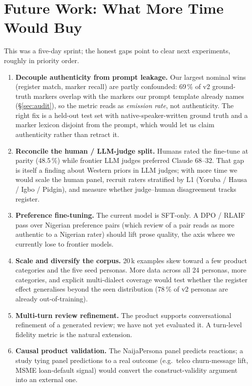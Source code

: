 \documentclass[sigconf,nonacm,balance]{acmart}
\begin{document}
\section{Future Work: What More Time Would Buy}
\label{sec:futurework}

This was a five-day sprint; the honest gaps point to clear next experiments,
roughly in priority order.

\begin{enumerate}[leftmargin=*]
  \item \textbf{Decouple authenticity from prompt leakage.} Our largest
        nominal wins (register match, marker recall) are partly confounded:
        69\,\% of v2 ground-truth markers overlap with the markers our prompt
        template already names (\S\ref{sec:audit}), so the metric reads as
        \emph{emission rate}, not authenticity. The right fix is a
        held-out test set with native-speaker-written ground truth and a
        marker lexicon disjoint from the prompt, which would let us claim
        authenticity rather than retract it.
  \item \textbf{Reconcile the human / LLM-judge split.} Humans rated the
        fine-tune at parity (48.5\,\%) while frontier LLM judges preferred
        Claude 68--32. That gap is itself a finding about Western priors in
        LLM judges; with more time we would scale the human panel, recruit
        raters stratified by L1 (Yoruba / Hausa / Igbo / Pidgin), and measure
        whether judge--human disagreement tracks register.
  \item \textbf{Preference fine-tuning.} The current model is SFT-only. A
        DPO / RLAIF pass over Nigerian preference pairs (which review of a
        pair reads as more authentic to a Nigerian rater) should lift prose
        quality, the axis where we currently lose to frontier models.
  \item \textbf{Scale and diversify the corpus.} 20\,k examples skew toward a
        few product categories and the five seed personas. More data across
        all 24 personas, more categories, and explicit multi-dialect coverage
        would test whether the register effect generalises beyond the seen
        distribution (78\,\% of v2 personas are already out-of-training).
  \item \textbf{Multi-turn review refinement.} The product supports
        conversational refinement of a generated review; we have not yet
        evaluated it. A turn-level fidelity metric is the natural extension.
  \item \textbf{Causal product validation.} The NaijaPersona panel predicts
        reactions; a study tying panel predictions to a real outcome (e.g.\
        telco churn-message lift, MSME loan-default signal) would convert the
        construct-validity argument into an external one.
\end{enumerate}
\end{document}
